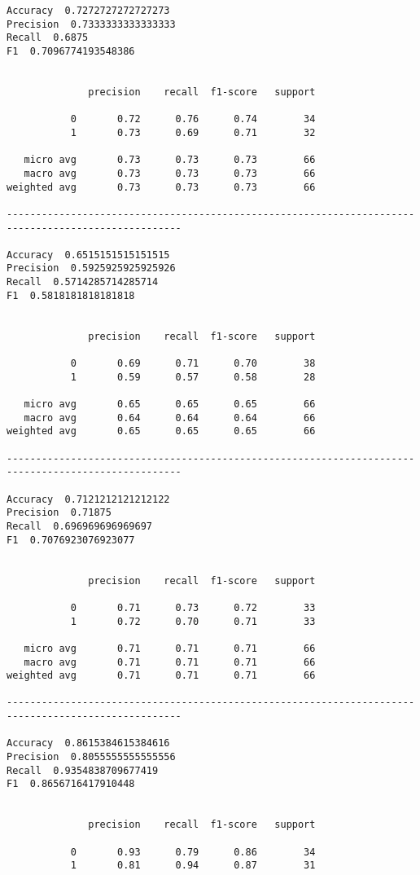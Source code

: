 \documentclass[11pt]{article}
\begin{document}
    \begin{Verbatim}[commandchars=\\\{\}]
Accuracy  0.7272727272727273
Precision  0.7333333333333333
Recall  0.6875
F1  0.7096774193548386


              precision    recall  f1-score   support

           0       0.72      0.76      0.74        34
           1       0.73      0.69      0.71        32

   micro avg       0.73      0.73      0.73        66
   macro avg       0.73      0.73      0.73        66
weighted avg       0.73      0.73      0.73        66

---------------------------------------------------------------------------------------------------- 

Accuracy  0.6515151515151515
Precision  0.5925925925925926
Recall  0.5714285714285714
F1  0.5818181818181818


              precision    recall  f1-score   support

           0       0.69      0.71      0.70        38
           1       0.59      0.57      0.58        28

   micro avg       0.65      0.65      0.65        66
   macro avg       0.64      0.64      0.64        66
weighted avg       0.65      0.65      0.65        66

---------------------------------------------------------------------------------------------------- 

Accuracy  0.7121212121212122
Precision  0.71875
Recall  0.696969696969697
F1  0.7076923076923077


              precision    recall  f1-score   support

           0       0.71      0.73      0.72        33
           1       0.72      0.70      0.71        33

   micro avg       0.71      0.71      0.71        66
   macro avg       0.71      0.71      0.71        66
weighted avg       0.71      0.71      0.71        66

---------------------------------------------------------------------------------------------------- 

Accuracy  0.8615384615384616
Precision  0.8055555555555556
Recall  0.9354838709677419
F1  0.8656716417910448


              precision    recall  f1-score   support

           0       0.93      0.79      0.86        34
           1       0.81      0.94      0.87        31


\end{Verbatim}
\end{document}
